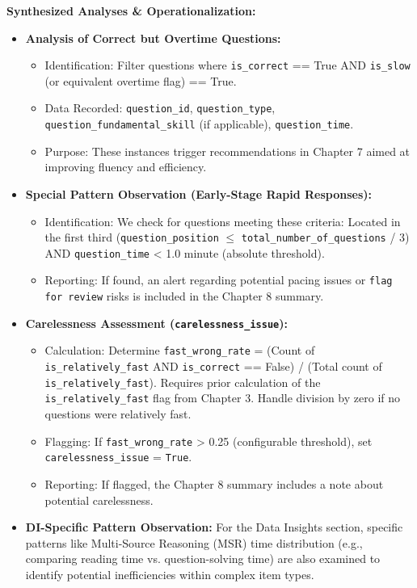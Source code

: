 \documentclass{article}
\begin{document}
\textbf{Synthesized Analyses \& Operationalization:}
\begin{itemize}
    \item \textbf{Analysis of Correct but Overtime Questions:}
    \begin{itemize}
        \item Identification: Filter questions where \texttt{is\_correct} == True AND \texttt{is\_slow} (or equivalent overtime flag) == True.
        \item Data Recorded: \texttt{question\_id}, \texttt{question\_type}, \texttt{question\_fundamental\_skill} (if applicable), \texttt{question\_time}.
        \item Purpose: These instances trigger recommendations in Chapter 7 aimed at improving fluency and efficiency.
    \end{itemize}
    \item \textbf{Special Pattern Observation (Early-Stage Rapid Responses):}
    \begin{itemize}
        \item Identification: We check for questions meeting these criteria:
        Located in the first third (\texttt{question\_position} $\leq$ \texttt{total\_number\_of\_questions} / 3) AND \texttt{question\_time} < 1.0 minute (absolute threshold).
        \item Reporting: If found, an alert regarding potential pacing issues or \texttt{flag for review} risks is included in the Chapter 8 summary.
    \end{itemize}
    \item \textbf{Carelessness Assessment (\texttt{carelessness\_issue}):}
    \begin{itemize}
        \item Calculation: Determine \texttt{fast\_wrong\_rate} = (Count of \texttt{is\_relatively\_fast} AND \texttt{is\_correct} == False) / (Total count of \texttt{is\_relatively\_fast}). Requires prior calculation of the \texttt{is\_relatively\_fast} flag from Chapter 3. Handle division by zero if no questions were relatively fast.
        \item Flagging: If \texttt{fast\_wrong\_rate} > 0.25 (configurable threshold), set \texttt{carelessness\_issue} = \texttt{True}.
        \item Reporting: If flagged, the Chapter 8 summary includes a note about potential carelessness.
    \end{itemize}
    \item \textbf{DI-Specific Pattern Observation:} For the Data Insights section, specific patterns like Multi-Source Reasoning (MSR) time distribution (e.g., comparing reading time vs. question-solving time) are also examined to identify potential inefficiencies within complex item types.

\end{itemize}
\end{document}
